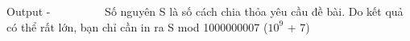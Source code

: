 Output  
-          Số nguyên S là số cách chia thỏa yêu cầu đề bài. Do kết quả có thể rất lớn, bạn chỉ cần in ra S mod 1000000007 ($10^{9}$   + 7)